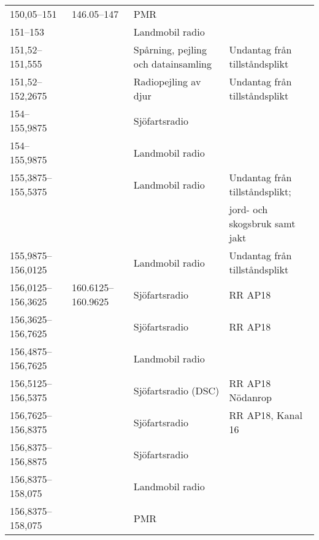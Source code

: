 \begin{landscape}
\begin{longtable}{llll}
	150,05--151        & 146.05--147        & PMR                                   &                                \\
	151--153           &                    & Landmobil radio                       &                                \\
	151,52--151,555    &                    & Spårning, pejling och datainsamling   & Undantag från tillståndsplikt  \\
	151,52--152,2675   &                    & Radiopejling av djur                  & Undantag från tillståndsplikt  \\
	154--155,9875      &                    & Sjöfartsradio                         &                                \\
	154--155,9875      &                    & Landmobil radio                       &                                \\
	155,3875--155,5375 &                    & Landmobil radio                       & Undantag från tillståndsplikt; \\
	                   &                    &                                       & jord- och skogsbruk samt jakt  \\
	155,9875--156,0125 &                    & Landmobil radio                       & Undantag från tillståndsplikt  \\
	156,0125--156,3625 & 160.6125--160.9625 & Sjöfartsradio                         & RR AP18                        \\
	156,3625--156,7625 &                    & Sjöfartsradio                         & RR AP18                        \\
	156,4875--156,7625 &                    & Landmobil radio                       &                                \\
	156,5125--156,5375 &                    & Sjöfartsradio (DSC)                   & RR AP18 Nödanrop               \\
	156,7625--156,8375 &                    & Sjöfartsradio                         & RR AP18, Kanal 16              \\
	156,8375--156,8875 &                    & Sjöfartsradio                         &                                \\
	156,8375--158,075  &                    & Landmobil radio                       &                                \\
	156,8375--158,075  &                    & PMR                                   &                                \\

\end{longtable}
\end{landscape}

